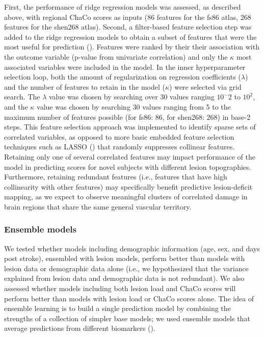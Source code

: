 \documentclass[10pt]{article}
\begin{document}
First, the performance of ridge regression models was assessed, as described above, with regional ChaCo scores as inputs (86 features for the fs86 atlas, 268 features for the shen268 atlas). Second, a filter-based feature selection step was added to the ridge regression models to obtain a subset of features that were the most useful for prediction (\cite{Guyon2003-kj, Hall1999-qr, Pudjihartono2022-zg}). Features were ranked by their their association with the outcome variable (p-value from univariate correlation) and only the $\kappa$ most associated variables were included in the model. In the inner hyperparameter selection loop, both the amount of regularization on regression coefficients ($\lambda$) and the number of features to retain in the model ($\kappa$) were selected via grid search. The $\lambda$ value was chosen by searching over 30 values ranging $10^-2$ to $10^2$, and the $\kappa$ value was chosen by searching 30 values ranging from 5 to the maximum number of features possible (for fs86: 86, for shen268: 268) in base-2 steps.  This feature selection approach was implemented to identify sparse sets of correlated variables, as opposed to more basic embedded feature selection techniques such as LASSO (\cite{Tibshirani1996-sk}) that randomly suppresses collinear features. Retaining only one of several correlated features may impact performance of the model in predicting scores for novel subjects with different lesion topographies. Furthermore, retaining redundant features (i.e., features that have high collinearity with other features) may specifically benefit predictive lesion-deficit mapping, as we expect to observe meaningful clusters of correlated damage in brain regions that share the same general vascular territory.

\subsubsection*{Ensemble models}

We tested whether models including demographic information (age, sex, and days post stroke), ensembled with lesion models, perform better than models with lesion data or demographic data alone (i.e., we hypothesized that the variance explained from lesion data and demographic data is not redundant). We also assessed whether models including both lesion load and ChaCo scores will perform better than models with lesion load or ChaCo scores alone. The idea of ensemble learning is to build a single prediction model by combining the strengths of a collection of simpler base models; we used ensemble models that average predictions from different biomarkers (\cite{Hastie2001-or}).
\end{document}
